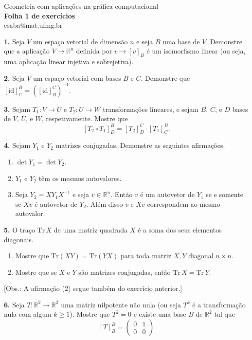 \documentclass{amsart}
\newcommand{\R}{\mathbb R}
\begin{document}
\begin{center}
\large Geometria com aplicações na gráfica computacional\\
{\bf\large Folha 1 de exercícios}\\
csaba@mat.ufmg.br
\end{center}


\bigskip

{\bf 1.} 
Seja $V$ um espaço vetorial de dimensão $n$ e seja $B$ uma base de $V$.    
Demonstre que a aplicação $V\to \R^n$ definida por $v\mapsto [v]_B$ é um isomorfismo linear (ou seja, uma aplicação linear 
    injetiva e sobrejetiva).

\medskip

{\bf 2.} Seja $V$ um espaço vetorial com bases $B$ e $C$.
    Demonstre que $[\mbox{id}]_C^B=([\mbox{id}]_B^C)^{-1}$. 

    \medskip

{\bf 3.} Sejam $T_1:V\to U$ e $T_2:U\to W$ transformações lineares, e sejam $B$, $C$, e $D$ bases de 
$V$, $U$, e $W$, respetivamente. Mostre que 
\[
[T_2\circ T_1]^B_D=[T_2]^C_D\cdot [T_1]^B_C.
\]

\medskip


{\bf 4.} 
    Sejam $Y_1$ e $Y_2$ matrizes conjugadas. Demonstre as seguintes afirmações. 
    \begin{enumerate}
        \item $\det Y_1=\det Y_2$.
        \item $Y_1$ e $Y_2$ têm os mesmos autovalores.
        \item Seja $Y_2=XY_1X^{-1}$ e seja $v\in\R^n$. Então $v$ é um autovetor de $Y_1$ se e somente se 
        $Xv$ é autovetor de $Y_2$. Além disso $v$ e $Xv$ correspondem ao mesmo autovalor.
    \end{enumerate}

    \medskip

{\bf 5.} O traço $\mbox{Tr}\,X$ de uma matriz quadrada $X$ é a soma dos seus elementos diagonais. 
\begin{enumerate}
    \item Mostre que $\mbox{Tr}(XY)=\mbox{Tr}(YX)$ para toda matriz $X,Y$ diagonal $n\times n$.
    \item Mostre que se $X$ e $Y$ são matrizes conjugadas, então $\mbox{Tr}\,X=\mbox{Tr}\,Y$.
\end{enumerate}
[Obs.: A afirmação (2) segue também do exercício anterior.]

\medskip


{\bf 6.} Seja $T:\R^2\to \R^2$ uma matriz nilpotente não nula (ou seja $T^k$ é a transformação nula com algum $k\geq 1$).
Mostre que $T^2=0$ e existe uma base $B$ de $\R^2$ tal que 
\[
    [T]_B^B=\begin{pmatrix} 0 & 1 \\ 0 & 0 \end{pmatrix}
\]
\end{document}
